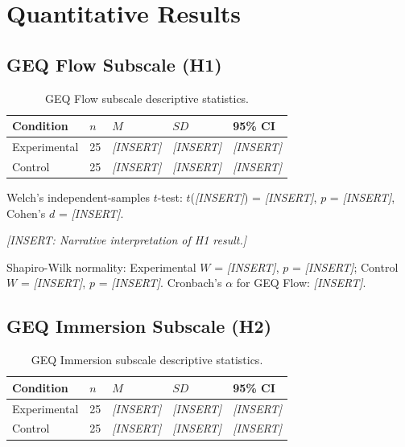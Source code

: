 \section{Quantitative Results}

\subsection{GEQ Flow Subscale (H1)}

\begin{table}[H]
\centering
\caption{GEQ Flow subscale descriptive statistics.}
\label{tab:geq_flow}
\small
\begin{tabular}{@{}lllll@{}}
\toprule
\textbf{Condition} & $n$ & $M$ & $SD$ & \textbf{95\% CI} \\
\midrule
Experimental & 25 & \textit{[INSERT]} & \textit{[INSERT]} & \textit{[INSERT]} \\
Control & 25 & \textit{[INSERT]} & \textit{[INSERT]} & \textit{[INSERT]} \\
\bottomrule
\end{tabular}
\end{table}

Welch's independent-samples $t$-test: $t$(\textit{[INSERT]}) = \textit{[INSERT]}, $p$ = \textit{[INSERT]}, Cohen's $d$ = \textit{[INSERT]}.

\textit{[INSERT: Narrative interpretation of H1 result.]}

Shapiro-Wilk normality: Experimental $W$ = \textit{[INSERT]}, $p$ = \textit{[INSERT]}; Control $W$ = \textit{[INSERT]}, $p$ = \textit{[INSERT]}. Cronbach's $\alpha$ for GEQ Flow: \textit{[INSERT]}.

\subsection{GEQ Immersion Subscale (H2)}

\begin{table}[H]
\centering
\caption{GEQ Immersion subscale descriptive statistics.}
\label{tab:geq_immersion}
\small
\begin{tabular}{@{}lllll@{}}
\toprule
\textbf{Condition} & $n$ & $M$ & $SD$ & \textbf{95\% CI} \\
\midrule
Experimental & 25 & \textit{[INSERT]} & \textit{[INSERT]} & \textit{[INSERT]} \\
Control & 25 & \textit{[INSERT]} & \textit{[INSERT]} & \textit{[INSERT]} \\
\bottomrule
\end{tabular}
\end{table}

